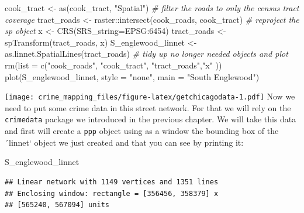 \documentclass[
  krantz2]{krantz}
\makeatletter
\newenvironment{Shaded}{\begin{snugshade}}{\end{snugshade}}
\newcommand{\AttributeTok}[1]{\textcolor[rgb]{0.61,0.61,0.61}{#1}}
\newcommand{\CommentTok}[1]{\textcolor[rgb]{0.37,0.37,0.37}{\textit{#1}}}
\newcommand{\FunctionTok}[1]{\textcolor[rgb]{0,0,0}{#1}}
\newcommand{\NormalTok}[1]{#1}
\newcommand{\OtherTok}[1]{\textcolor[rgb]{0.37,0.37,0.37}{#1}}
\newcommand{\SpecialCharTok}[1]{\textcolor[rgb]{0,0,0}{#1}}
\newcommand{\StringTok}[1]{\textcolor[rgb]{0.5,0.5,0.5}{#1}}
\newenvironment{kframe}{%
\medskip{}
\setlength{\fboxsep}{.8em}
 \def\at@end@of@kframe{}%
 \ifinner\ifhmode%
  \def\at@end@of@kframe{\end{minipage}}%
  \begin{minipage}{\columnwidth}%
 \fi\fi%
 \def\FrameCommand##1{\hskip\@totalleftmargin \hskip-\fboxsep
 \colorbox{shadecolor}{##1}\hskip-\fboxsep
     \hskip-\linewidth \hskip-\@totalleftmargin \hskip\columnwidth}%
 \MakeFramed {\advance\hsize-\width
   \@totalleftmargin\z@ \linewidth\hsize
   \@setminipage}}%
 {\par\unskip\endMakeFramed%
 \at@end@of@kframe}
\renewenvironment{Shaded}{\begin{kframe}}{\end{kframe}}
\makeatother
\begin{document}
\begin{verbatim}
\end{verbatim}

\begin{Shaded}
\begin{Highlighting}[]
\NormalTok{cook\_tract }\OtherTok{\textless{}{-}} \FunctionTok{as}\NormalTok{(cook\_tract, }\StringTok{"Spatial"}\NormalTok{)}
\CommentTok{\# filter the roads to only the census tract coverage}
\NormalTok{tract\_roads }\OtherTok{\textless{}{-}}\NormalTok{ raster}\SpecialCharTok{::}\FunctionTok{intersect}\NormalTok{(cook\_roads, cook\_tract)}
\CommentTok{\# reproject the sp object}
\NormalTok{x }\OtherTok{\textless{}{-}} \FunctionTok{CRS}\NormalTok{(}\AttributeTok{SRS\_string=}\StringTok{\textquotesingle{}EPSG:6454\textquotesingle{}}\NormalTok{)}
\NormalTok{tract\_roads }\OtherTok{\textless{}{-}} \FunctionTok{spTransform}\NormalTok{(tract\_roads, x)}
\NormalTok{S\_englewood\_linnet }\OtherTok{\textless{}{-}} \FunctionTok{as.linnet.SpatialLines}\NormalTok{(tract\_roads)}
\CommentTok{\# tidy up no longer needed objects and plot}
\FunctionTok{rm}\NormalTok{(}\AttributeTok{list =} \FunctionTok{c}\NormalTok{(}\StringTok{"cook\_roads"}\NormalTok{, }\StringTok{"cook\_tract"}\NormalTok{, }\StringTok{"tract\_roads"}\NormalTok{,}\StringTok{"x"}\NormalTok{ ))}
\FunctionTok{plot}\NormalTok{(S\_englewood\_linnet, }\AttributeTok{style =} \StringTok{"none"}\NormalTok{, }\AttributeTok{main =} \StringTok{"South Englewood"}\NormalTok{)}
\end{Highlighting}
\end{Shaded}

\texttt{[image: crime\_mapping\_files/figure-latex/getchicagodata-1.pdf]}
Now we need to put some crime data in this street network. For that we will rely on the \texttt{crimedata} package we introduced in the previous chapter. We will take this data and first will create a \texttt{ppp} object using as a window the bounding box of the ´linnet` object we just created and that you can see by printing it:

\begin{Shaded}
\begin{Highlighting}[]
\NormalTok{S\_englewood\_linnet}
\end{Highlighting}
\end{Shaded}

\begin{verbatim}
## Linear network with 1149 vertices and 1351 lines
## Enclosing window: rectangle = [356456, 358379] x 
## [565240, 567094] units
\end{verbatim}
\end{document}
